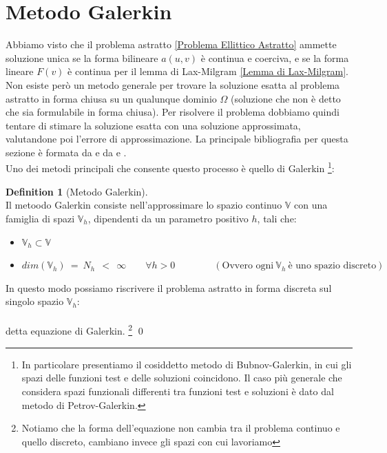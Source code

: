 \documentclass[12pt,a4paper]{report}
\theoremstyle{theorem}
\theoremstyle{theorem}
\theoremstyle{definition}
\newtheorem{definition}{Definition}[section]
\begin{document}
\section{Metodo Galerkin}
Abbiamo visto che il problema astratto \ref{Problema Ellittico Astratto} ammette soluzione unica se la forma bilineare $a(u,v)$ è continua e coerciva, e se la forma lineare $F(v)$ è continua per il lemma di Lax-Milgram \ref{Lemma di Lax-Milgram}. Non esiste però un metodo generale per trovare la soluzione esatta al problema astratto in forma chiusa su un qualunque dominio $\Omega$ (soluzione che non è detto che sia formulabile in forma chiusa). Per risolvere il problema dobbiamo quindi tentare di stimare la soluzione esatta con una soluzione approssimata, valutandone poi l'errore di approssimazione. La principale bibliografia per questa sezione è formata da \cite{BS} e da \cite{Ciarlet} e \cite{Q}.\\
Uno dei metodi principali che consente questo processo è quello di Galerkin \footnote{In particolare presentiamo il cosiddetto metodo di Bubnov-Galerkin, in cui gli spazi delle funzioni test e delle soluzioni coincidono. Il caso più generale che considera spazi funzionali differenti tra funzioni test e soluzioni è dato dal metodo di Petrov-Galerkin.}:
\begin{definition} [Metodo Galerkin]  \label{Metodo Galerkin}
\hfill \\
Il metoodo Galerkin consiste nell'approssimare lo spazio continuo $\mathbb{V}$ con una famiglia di spazi $\mathbb{V}_{h}$, dipendenti da un parametro positivo $h$, tali che:
\begin{itemize}
	\item $\mathbb{V}_{h} \subset \mathbb{V}$
	\item $dim \left( \mathbb{V}_{h} \right) \ = \ N_{h} \ \ < \ \ \infty \qquad \forall h > 0 \qquad \qquad ( \text{Ovvero ogni} \ \mathbb{V}_{h} \ \text{è uno spazio discreto} )$
\end{itemize}
In questo modo possiamo riscrivere il problema astratto in forma discreta sul singolo spazio $\mathbb{V}_{h}$:
\\
\hfill \\
detta equazione di Galerkin. \footnote{Notiamo che la forma dell'equazione non cambia tra il problema continuo e quello discreto, cambiano invece gli spazi con cui lavoriamo}
\qed
\end{definition}
\end{document}
